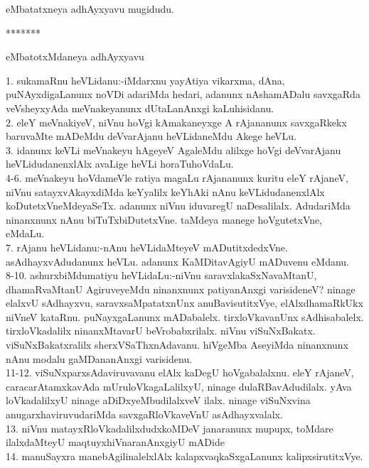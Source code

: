 \documentclass{article}
\begin{document}
\begin{center}
eMbatatxneya adhAyxyavu mugidudu.
\end{center}

\begin{center}
*******
\end{center}

\begin{center}
eMbatotxMdaneya adhAyxyavu
\end{center}

1. sukamaRnu heVLidanu:-iMdarxnu yayAtiya vikarxma, dAna, puNAyxdigaLanunx noVDi adariMda hedari, adanunx nAshamADalu savxgaRda veVsheyxyAda meVnakeyanunx dUtaLanAnxgi kaLuhisidanu.\\
2. eleY meVnakiyeV, niVnu hoVgi kAmakaneyxge A rAjananunx savxgaRkekx baruvaMte mADeMdu deVvarAjanu heVLidaneMdu Akege heVLu.\\
3. idanunx keVLi meVnakeyu hAgeyeV AgaleMdu alilxge hoVgi deVvarAjanu heVLidudanenxlAlx avaLige heVLi horaTuhoVdaLu.\\
4-6. meVnakeyu hoVdameVle ratiya magaLu rAjananunx kuritu eleY rAjaneV, niVnu satayxvAkayxdiMda keYyalilx keYhAki nAnu keVLidudanenxlAlx koDutetxVneMdeyaSeTx. adanunx niVnu iduvaregU naDesalilalx. AdudariMda ninanxnunx nAnu biTuTxbiDutetxVne. taMdeya manege hoVgutetxVne, eMdaLu.\\
7. rAjanu heVLidanu:-nAnu heVLidaMteyeV mADutitxdedxVne. asAdhayxvAdudanunx heVLu. adanunx KaMDitavAgiyU mADuvenu eMdanu.\\
8-10. ashurxbiMdumatiyu heVLidaLu:-niVnu saravxlakaSxNavaMtanU, dhamaRvaMtanU AgiruveyeMdu ninanxnunx patiyanAnxgi varisideneV? ninage elalxvU sAdhayxvu, saravxsaMpatatxnUnx anuBavisutitxVye, elAlxdhamaRkUkx niVneV kataRnu. puNayxgaLanunx mADabalelx. tirxloVkavanUnx sAdhisabalelx. tirxloVkadalilx ninanxMtavarU beVrobabxrilalx. niVnu viSuNxBakatx. viSuNxBakatxralilx sherxVSaThxnAdavanu. hiVgeMba AseyiMda ninanxnunx nAnu modalu gaMDananAnxgi varisidenu.\\
11-12. viSuNxparxsAdaviruvavanu elAlx kaDegU hoVgabalalxnu. eleY rAjaneV, caracarAtamxkavAda mUruloVkagaLalilxyU, ninage dulaRBavAdudilalx. yAva loVkadalilxyU ninage aDiDxyeMbudilalxveV ilalx. ninage viSuNxvina anugarxhaviruvudariMda savxgaRloVkaveVnU asAdhayxvalalx.\\
13. niVnu matayxRloVkadalilxdudxkoMDeV janaranunx mupupx, toMdare ilalxdaMteyU maqtuyxhiVnaranAnxgiyU mADide\\
14. manuSayxra manebAgilinalelxlAlx kalapxvaqkaSxgaLanunx kalipxsirutitxVye.\\
\end{document}
